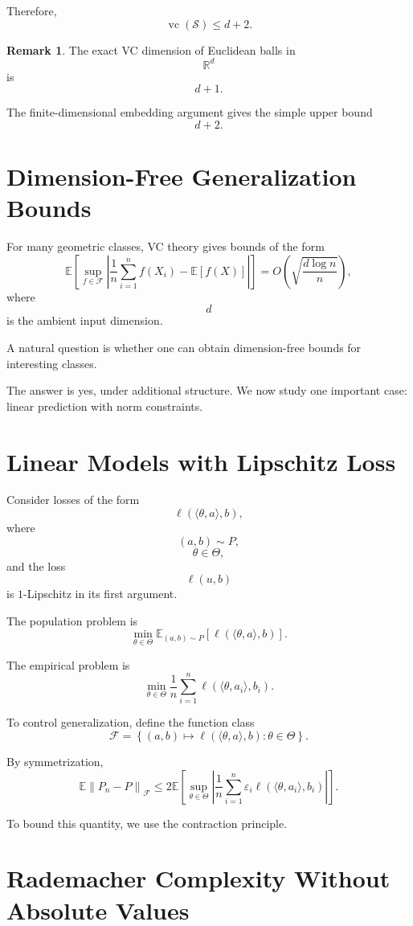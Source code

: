 \documentclass[12pt,oneside]{book}
\numberwithin{equation}{section}
\theoremstyle{definition}
\newtheorem{remark}{Remark}[section]
\theoremstyle{plain}
\theoremstyle{remark}
\newcommand{\R}{\mathbb{R}}
\newcommand{\E}{\mathbb{E}}
\newcommand{\norm}[1]{\left\lVert #1 \right\rVert}
\begin{document}
Therefore,
\[
\operatorname{vc}(\mathcal{S})
\leq
d+2.
\]

\begin{remark}
The exact VC dimension of Euclidean balls in
\[
\R^d
\]
is
\[
d+1.
\]

The finite-dimensional embedding argument gives the simple upper bound
\[
d+2.
\]
\end{remark}

\section{Dimension-Free Generalization Bounds}

For many geometric classes, VC theory gives bounds of the form
\[
\E\left[
\sup_{f\in\mathcal{F}}
\left|
\frac{1}{n}\sum_{i=1}^n f(X_i)-\E[f(X)]
\right|
\right]
=
O\left(
\sqrt{\frac{d\log n}{n}}
\right),
\]
where
\[
d
\]
is the ambient input dimension.

A natural question is whether one can obtain dimension-free bounds for interesting classes.

The answer is yes, under additional structure. We now study one important case: linear prediction with norm constraints.

\section{Linear Models with Lipschitz Loss}

Consider losses of the form
\[
\ell(\langle \theta,a\rangle,b),
\]
where
\[
(a,b)\sim P,
\]
\[
\theta\in\Theta,
\]
and the loss
\[
\ell(u,b)
\]
is $1$-Lipschitz in its first argument.

The population problem is
\[
\min_{\theta\in\Theta}
\E_{(a,b)\sim P}
\left[
\ell(\langle \theta,a\rangle,b)
\right].
\]

The empirical problem is
\[
\min_{\theta\in\Theta}
\frac{1}{n}
\sum_{i=1}^n
\ell(\langle \theta,a_i\rangle,b_i).
\]

To control generalization, define the function class
\[
\mathcal{F}
=
\left\{
(a,b)\mapsto
\ell(\langle \theta,a\rangle,b)
:
\theta\in\Theta
\right\}.
\]

By symmetrization,
\[
\E\norm{P_n-P}_{\mathcal{F}}
\leq
2
\E
\left[
\sup_{\theta\in\Theta}
\left|
\frac{1}{n}
\sum_{i=1}^n
\varepsilon_i
\ell(\langle \theta,a_i\rangle,b_i)
\right|
\right].
\]

To bound this quantity, we use the contraction principle.

\section{Rademacher Complexity Without Absolute Values}
\end{document}
